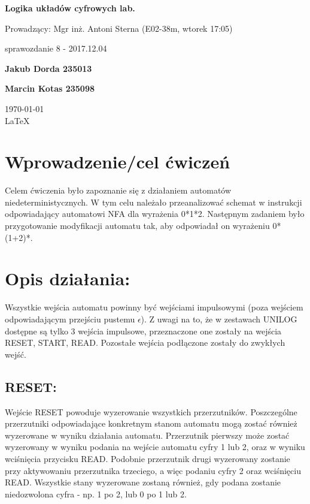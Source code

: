 \documentclass[12pt,a4paper]{article}
\begin{document}
	
	\begin{titlepage}
		
		\centering
		{\huge\bfseries Logika układów cyfrowych lab.\par}
		
		\vspace{0.5cm}
		Prowadzący: Mgr inż. Antoni Sterna (E02-38m, wtorek 17:05) \\
	
		\vspace{1.1cm}
		{\Large sprawozdanie 8 - 2017.12.04\par}
		\vfill
		
		{\large\bfseries Jakub Dorda 235013\par}
		{\large\bfseries Marcin Kotas 235098\par}
		
		\vspace{1cm}
		\today \\ \LaTeX
		
		\restoregeometry
	\end{titlepage}


	\section{Wprowadzenie/cel ćwiczeń}
	
		Celem ćwiczenia było zapoznanie się z działaniem automatów niedeterministycznych.
		W tym celu należało przeanalizować schemat w instrukcji odpowiadający automatowi NFA dla wyrażenia 0*1*2.
		Następnym zadaniem było przygotowanie modyfikacji automatu tak, aby odpowiadał on wyrażeniu 0*(1+2)*.
		
	\section{Opis działania:}

			Wszystkie wejścia automatu powinny być wejściami impulsowymi (poza wejściem odpowiadającym przejściu pustemu \(\epsilon\)).
			Z uwagi na to, że w zestawach UNILOG dostępne są tylko 3 wejścia impulsowe, przeznaczone one zostały na wejścia RESET, START, READ.
			Pozostałe wejścia podłączone zostały do zwykłych wejść.

		\subsection{RESET:}
			Wejście RESET powoduje wyzerowanie wszystkich przerzutników.
			Poszczególne przerzutniki odpowiadające konkretnym stanom automatu mogą zostać również wyzerowane w wyniku działania automatu.
			Przerzutnik pierwszy może zostać wyzerowany w wyniku podania na wejście automatu cyfry 1 lub 2, oraz w wyniku wciśnięcia przycisku READ.
			Podobnie przerzutnik drugi wyzerowany zostanie przy aktywowaniu przerzutnika trzeciego, a więc podaniu cyfry 2 oraz wciśnięciu READ.
			Wszystkie stany wyzerowane zostaną również, gdy podana zostanie niedozwolona cyfra - np. 1 po 2, lub 0 po 1 lub 2.
\end{document}
